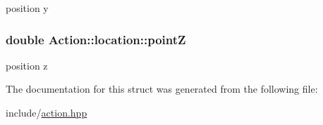 position y 

\hypertarget{structAction_1_1location_adafdc7ffa240979fd0a7a86ab43fb6fc}{
\subsubsection[{point\-Z}]{\setlength{\rightskip}{0pt plus 5cm}double Action\-::location\-::point\-Z}}\label{structAction_1_1location_adafdc7ffa240979fd0a7a86ab43fb6fc}


position z 



The documentation for this struct was generated from the following file\-:\begin{DoxyCompactItemize}
\item 
include/\hyperlink{action_8hpp}{action.\-hpp}\end{DoxyCompactItemize}
